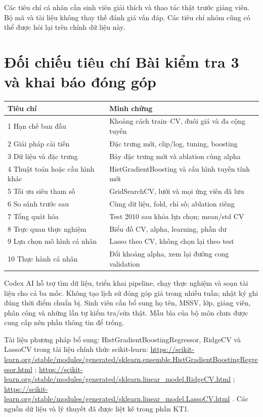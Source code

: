 \documentclass[12pt,a4paper]{article}
\begin{document}
Các tiêu chí cá nhân cần sinh viên giải thích và thao tác thật trước giảng viên. Bộ mã và tài liệu không thay thế đánh giá vấn đáp. Các tiêu chí nhóm cũng có thể được hỏi lại trên chính dữ liệu này.


\clearpage\section{Đối chiếu tiêu chí Bài kiểm tra 3 và khai báo đóng góp}

\begingroup\small\begin{tabularx}{\linewidth}{YY}\toprule\textbf{Tiêu chí}&\textbf{Minh chứng}\\\midrule

1 Hạn chế ban đầu & Khoảng cách train–CV, đuôi giá và đa cộng tuyến\\

2 Giải pháp cải tiến & Đặc trưng mới, clip/log, tuning, boosting\\

3 Dữ liệu và đặc trưng & Bảy đặc trưng mới và ablation cùng alpha\\

4 Thuật toán hoặc cấu hình khác & HistGradientBoosting và cấu hình tuyến tính mới\\

5 Tối ưu siêu tham số & GridSearchCV, lưới và mọi ứng viên đã lưu\\

6 So sánh trước sau & Cùng dữ liệu, fold, chỉ số; ablation riêng\\

7 Tổng quát hóa & Test 2010 sau khóa lựa chọn; mean/std CV\\

8 Trực quan thực nghiệm & Biểu đồ CV, alpha, learning, phần dư\\

9 Lựa chọn mô hình cá nhân & Lasso theo CV, không chọn lại theo test\\

10 Thực hành cá nhân & Đổi khoảng alpha, xem lại đường cong validation\\

\bottomrule\end{tabularx}\endgroup

Codex AI hỗ trợ tìm dữ liệu, triển khai pipeline, chạy thực nghiệm và soạn tài liệu cho cả ba mốc. Không tạo lịch sử đóng góp giả trong nhiều tuần; nhật ký ghi đúng thời điểm chuẩn bị. Sinh viên cần bổ sung họ tên, MSSV, lớp, giảng viên, phân công và những lần tự kiểm tra/sửa thật. Mẫu bìa của bộ môn chưa được cung cấp nên phần thông tin để trống.


Tài liệu phương pháp bổ sung: HistGradientBoostingRegressor, RidgeCV và LassoCV trong tài liệu chính thức scikit-learn: \url{https://scikit-learn.org/stable/modules/generated/sklearn.ensemble.HistGradientBoostingRegressor.html} ; \url{https://scikit-learn.org/stable/modules/generated/sklearn.linear_model.RidgeCV.html} ; \url{https://scikit-learn.org/stable/modules/generated/sklearn.linear_model.LassoCV.html} . Các nguồn dữ liệu và lý thuyết đã được liệt kê trong phần KT1.
\end{document}
